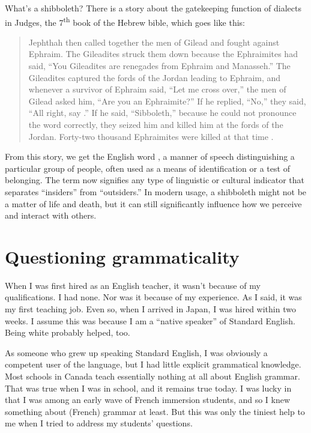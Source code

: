 \begin{tblsframed}{What's a shibboleth?} \label{sec:shibboleth}
    There is a story about the gatekeeping function of dialects in Judges, the 7\textsuperscript{th}
    book of the Hebrew bible, which goes like this:
    
    \begin{quote}
        Jephthah then called together the men of Gilead and fought against Ephraim. The Gileadites struck them down because the Ephraimites had said, \enquote{You Gileadites are renegades from Ephraim and Manasseh.} The Gileadites captured the fords of the Jordan leading to Ephraim, and whenever a survivor of Ephraim said, \enquote{Let me cross over,} the men of Gilead asked him, \enquote{Are you an Ephraimite?} If he replied, \enquote{No,} they said, \enquote{All right, say .} If he said, \enquote{Sibboleth,} because he could not pronounce the word correctly, they seized him and killed him at the fords of the Jordan. Forty-two thousand Ephraimites were killed at that time \citep[Judges 12:4]{NIV2011}.
    \end{quote}

    \indent From this story, we get the English word , a manner of speech distinguishing a particular group of people, often used as a means of identification or a test of belonging. The term  now signifies any type of linguistic or cultural indicator that separates \enquote{insiders} from \enquote{outsiders.} In modern usage, a shibboleth might not be a matter of life and death, but it can still significantly influence how we perceive and interact with others.

\end{tblsframed}

\section{Questioning grammaticality} \label{sec:questioning-grammaticality}

When I was first hired as an English teacher, it wasn't because of my qualifications. I had none. Nor was it because of my experience. As I said, it was my first teaching job. Even so, when I arrived in Japan, I was hired within two weeks. I assume this was because I am a \enquote{native speaker} of Standard English. Being white probably helped, too.

As someone who grew up speaking Standard English, I was obviously a competent user of the language, but I had little explicit grammatical knowledge. Most schools in Canada teach essentially nothing at all about English grammar. That was true when I was in school, and it remains true today. I was lucky in that I was among an early wave of French immersion students, and so I knew something about (French) grammar at least. But this was only the tiniest help to me when I tried to address my students' questions.

